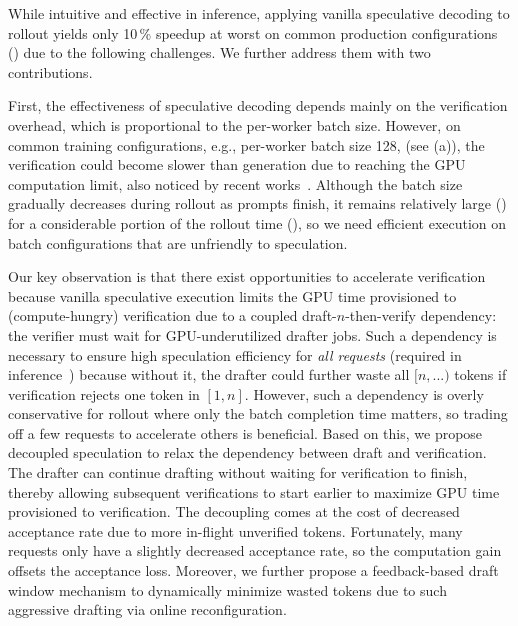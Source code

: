 While intuitive and effective in inference, applying vanilla speculative decoding
to rollout yields only {10\,\%} speedup at worst on common production configurations 
(\textsection{\ref{sec:eval-e2e}})
due to the following challenges. We further address them with 
two contributions.

First, the effectiveness of speculative decoding depends mainly on the verification overhead,
which is proportional to the per-worker batch size. 
However, on common training configurations, e.g., per-worker batch size 128, (see {} (a)),
the verification could become slower than generation 
due to reaching the GPU computation limit,
also noticed by recent works~\cite{eagle-3,turbospec}.
Although the batch size gradually decreases during rollout as prompts finish,
it remains relatively large () for a considerable portion of the rollout time (),
so we need efficient execution on batch configurations 
that are unfriendly to speculation.

Our key observation is that there exist opportunities to accelerate verification because
vanilla speculative execution limits the GPU time provisioned to (compute-hungry) verification
due to a coupled draft-$n$-then-verify dependency:
the verifier must wait for GPU-underutilized drafter jobs.
Such a dependency is necessary to ensure high speculation efficiency for \emph{all requests} 
(required in inference~\cite{turbospec})
because without it, 
the drafter could further waste all $[n,...)$ tokens if verification rejects one token in $[1,n]$.
However, such a dependency is overly conservative for rollout 
where only the batch completion time matters,
so trading off a few requests to accelerate others is beneficial.
Based on this, we propose decoupled speculation to relax the dependency 
between draft and verification. 
The drafter can continue drafting without waiting for verification to finish,
thereby allowing subsequent verifications to start earlier to maximize GPU time provisioned to verification.
The decoupling comes at the cost of decreased acceptance rate due to more in-flight unverified tokens.
Fortunately, many requests only have a slightly decreased acceptance rate,
so the computation gain offsets the acceptance loss.
Moreover, we further propose a
feedback-based draft window mechanism to dynamically minimize wasted tokens due to such aggressive drafting 
via online reconfiguration.



